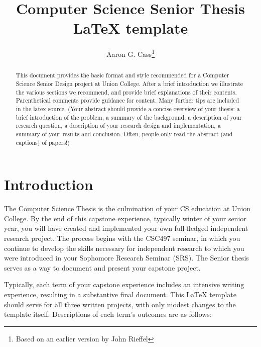 \documentclass[final]{union-cs-thesis}
\begin{document}
\title{Computer Science Senior Thesis \LaTeX{} template}
\author{Aaron G. Cass\footnote{Based on an earlier version by John Rieffel}}
\maketitle

\begin{abstract}

This document provides the basic format and style recommended for a
Computer Science Senior Design project at Union College.  After a
brief introduction we illustrate the various sections we recommend, and
provide brief explanations of their contents.  Parenthetical comments
provide guidance for content.  Many further tips are included in the
latex source. (Your abstract should provide a concise
overview of your thesis: a brief introduction of the problem, a
summary of the background, a description of your research question, a
description of your research design and implementation, a summary of
your results and conclusion. Often, people only read the abstract (and
captions) of papers!)

\end{abstract}

\tableofcontents %
\listoffigures %
\listoftables %

\section{Introduction} %

The Computer Science Thesis is the culmination of your CS
education at Union College.  By the end of this capstone experience,
typically winter of your senior year, you will have created and
implemented your own full-fledged independent research project.  The
process begins with the CSC497 seminar, in which you continue to
develop the skills necessary for independent research to which you were
introduced in your Sophomore Research Seminar (SRS).  The Senior
thesis serves as a way to document and present your capstone project. 

Typically, each term of your capstone experience includes an intensive
writing experience, resulting in a substantive final document.  This
LaTeX template should serve for all three written projects, with only
modest changes to the template itself.  Descriptions of each term's
outcomes are as follows:
\end{document}
